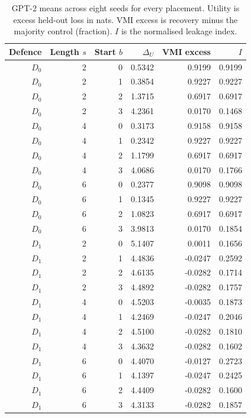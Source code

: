 \documentclass[11pt]{article}
\begin{document}
\begin{table}[H]
\centering\small
\begin{tabular}{rrrrrr}
\toprule
Defence & Length $s$ & Start $b$ & $\Delta_U$ & VMI excess & $I$ \\
\midrule
$D_0$ & 2 & 0 & 0.5342 & 0.9199 & 0.9199 \\
$D_0$ & 2 & 1 & 0.3854 & 0.9227 & 0.9227 \\
$D_0$ & 2 & 2 & 1.3715 & 0.6917 & 0.6917 \\
$D_0$ & 2 & 3 & 4.2361 & 0.0170 & 0.1468 \\
$D_0$ & 4 & 0 & 0.3173 & 0.9158 & 0.9158 \\
$D_0$ & 4 & 1 & 0.2342 & 0.9227 & 0.9227 \\
$D_0$ & 4 & 2 & 1.1799 & 0.6917 & 0.6917 \\
$D_0$ & 4 & 3 & 4.0686 & 0.0170 & 0.1766 \\
$D_0$ & 6 & 0 & 0.2377 & 0.9098 & 0.9098 \\
$D_0$ & 6 & 1 & 0.1345 & 0.9227 & 0.9227 \\
$D_0$ & 6 & 2 & 1.0823 & 0.6917 & 0.6917 \\
$D_0$ & 6 & 3 & 3.9813 & 0.0170 & 0.1854 \\
\midrule
$D_1$ & 2 & 0 & 5.1407 & 0.0011 & 0.1656 \\
$D_1$ & 2 & 1 & 4.4836 & -0.0247 & 0.2592 \\
$D_1$ & 2 & 2 & 4.6135 & -0.0282 & 0.1714 \\
$D_1$ & 2 & 3 & 4.4892 & -0.0282 & 0.1757 \\
$D_1$ & 4 & 0 & 4.5203 & -0.0035 & 0.1873 \\
$D_1$ & 4 & 1 & 4.2469 & -0.0247 & 0.2046 \\
$D_1$ & 4 & 2 & 4.5100 & -0.0282 & 0.1810 \\
$D_1$ & 4 & 3 & 4.3632 & -0.0282 & 0.1602 \\
$D_1$ & 6 & 0 & 4.4070 & -0.0127 & 0.2723 \\
$D_1$ & 6 & 1 & 4.1397 & -0.0247 & 0.2425 \\
$D_1$ & 6 & 2 & 4.4409 & -0.0282 & 0.1600 \\
$D_1$ & 6 & 3 & 4.3133 & -0.0282 & 0.1857 \\
\bottomrule
\end{tabular}
\caption{GPT-2 means across eight seeds for every placement. Utility is excess held-out loss in nats. VMI excess is recovery minus the majority control (fraction). $I$ is the normalised leakage index.}
\label{tab:p6cells}
\end{table}
\end{document}

